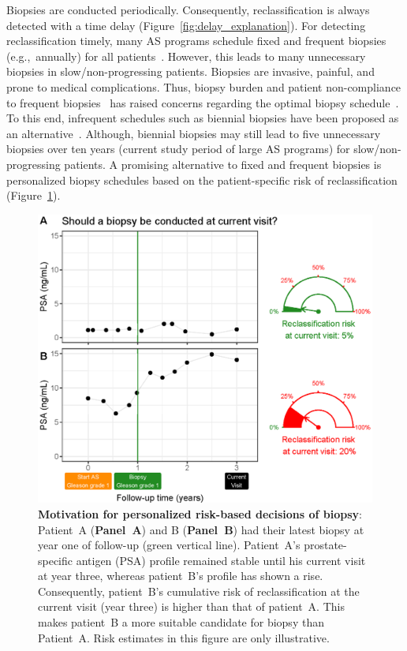 Biopsies are conducted periodically. Consequently, reclassification is always detected with a time delay (Figure~\ref{fig:delay_explanation}). For detecting reclassification timely, many AS programs schedule fixed and frequent biopsies (e.g.,~annually) for all patients~\citep{nieboer2018active,loeb2014heterogeneity}. However, this leads to many unnecessary biopsies in slow/non-progressing patients. Biopsies are invasive, painful, and prone to medical complications. Thus, biopsy burden and patient non-compliance to frequent biopsies~\citep{bokhorst2015compliance} has raised concerns regarding the optimal biopsy schedule~\citep{inoue2018comparative, bratt2013study}. To this end, infrequent schedules such as biennial biopsies have been proposed as an alternative~\citep{inoue2018comparative,de2017estimating}. Although, biennial biopsies may still lead to five unnecessary biopsies over ten years (current study period of large AS programs) for slow/non-progressing patients. A promising alternative to fixed and frequent biopsies is personalized biopsy schedules based on the patient-specific risk of reclassification (Figure~\ref{fig:riskBasedExample}).

\begin{figure}
\centerline{\includegraphics[width=\columnwidth]{images/riskBasedExample.eps}}
\caption{\textbf{Motivation for personalized risk-based decisions of biopsy}: Patient~A (\textbf{Panel~A}) and B (\textbf{Panel~B}) had their latest biopsy at year one of follow-up (green vertical line). Patient~A's prostate-specific antigen (PSA) profile remained stable until his current visit at year three, whereas patient~B's profile has shown a rise. Consequently, patient~B's cumulative risk of reclassification at the current visit (year three) is higher than that of patient~A. This makes patient~B a more suitable candidate for biopsy than Patient~A. Risk estimates in this figure are only illustrative.}
\label{fig:riskBasedExample}
\end{figure}

